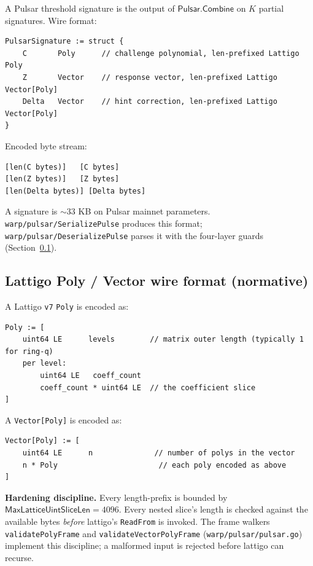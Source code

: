 \documentclass[11pt,a4paper]{article}
\begin{document}
A Pulsar threshold signature is the output of $\mathsf{Pulsar.Combine}$ on $K$ partial signatures. Wire format:

\begin{lstlisting}
PulsarSignature := struct {
    C       Poly      // challenge polynomial, len-prefixed Lattigo Poly
    Z       Vector    // response vector, len-prefixed Lattigo Vector[Poly]
    Delta   Vector    // hint correction, len-prefixed Lattigo Vector[Poly]
}
\end{lstlisting}

Encoded byte stream:

\begin{lstlisting}
[len(C bytes)]   [C bytes]
[len(Z bytes)]   [Z bytes]
[len(Delta bytes)] [Delta bytes]
\end{lstlisting}

A signature is $\sim 33$ KB on Pulsar mainnet parameters. \texttt{warp/pulsar/SerializePulse} produces this format; \texttt{warp/pulsar/DeserializePulse} parses it with the four-layer guards (Section~\ref{sec:lattigo-vector}).

\subsection{Lattigo Poly / Vector wire format (normative)}
\label{sec:lattigo-vector}

A Lattigo \texttt{v7} \texttt{Poly} is encoded as:

\begin{lstlisting}
Poly := [
    uint64 LE      levels        // matrix outer length (typically 1 for ring-q)
    per level:
        uint64 LE   coeff_count
        coeff_count * uint64 LE  // the coefficient slice
]
\end{lstlisting}

A \texttt{Vector[Poly]} is encoded as:

\begin{lstlisting}
Vector[Poly] := [
    uint64 LE      n              // number of polys in the vector
    n * Poly                       // each poly encoded as above
]
\end{lstlisting}

\textbf{Hardening discipline.} Every length-prefix is bounded by $\mathsf{MaxLatticeUintSliceLen} = 4096$. Every nested slice's length is checked against the available bytes \emph{before} lattigo's \texttt{ReadFrom} is invoked. The frame walkers \texttt{validatePolyFrame} and \texttt{validateVectorPolyFrame} (\texttt{warp/pulsar/pulsar.go}) implement this discipline; a malformed input is rejected before lattigo can recurse.
\end{document}
